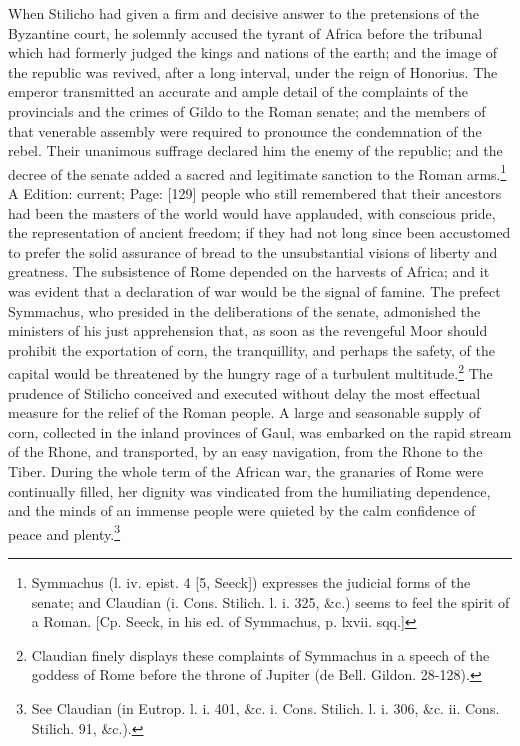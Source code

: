 When Stilicho had given a firm and decisive answer to the pretensions of the Byzantine court, he solemnly accused the tyrant of Africa before the tribunal which had formerly judged the kings and nations of the earth; and the image of the republic was revived, after a long interval, under the reign of Honorius. The emperor transmitted an accurate and ample detail of the complaints of the provincials and the crimes of Gildo to the Roman senate; and the members of that venerable assembly were required to pronounce the condemnation of the rebel. Their unanimous suffrage declared him the enemy of the republic; and the decree of the senate added a sacred and legitimate sanction to the Roman arms.\footnote{Symmachus (l. iv. epist. 4 [5, Seeck]) expresses the judicial forms of the senate; and Claudian (i. Cons. Stilich. l. i. 325, \&c.) seems to feel the spirit of a Roman. [Cp. Seeck, in his ed. of Symmachus, p. lxvii. sqq.]} A Edition: current; Page: [129] people who still remembered that their ancestors had been the masters of the world would have applauded, with conscious pride, the representation of ancient freedom; if they had not long since been accustomed to prefer the solid assurance of bread to the unsubstantial visions of liberty and greatness. The subsistence of Rome depended on the harvests of Africa; and it was evident that a declaration of war would be the signal of famine. The prefect Symmachus, who presided in the deliberations of the senate, admonished the ministers of his just apprehension that, as soon as the revengeful Moor should prohibit the exportation of corn, the tranquillity, and perhaps the safety, of the capital would be threatened by the hungry rage of a turbulent multitude.\footnote{Claudian finely displays these complaints of Symmachus in a speech of the goddess of Rome before the throne of Jupiter (de Bell. Gildon. 28-128).} The prudence of Stilicho conceived and executed without delay the most effectual measure for the relief of the Roman people. A large and seasonable supply of corn, collected in the inland provinces of Gaul, was embarked on the rapid stream of the Rhone, and transported, by an easy navigation, from the Rhone to the Tiber. During the whole term of the African war, the granaries of Rome were continually filled, her dignity was vindicated from the humiliating dependence, and the minds of an immense people were quieted by the calm confidence of peace and plenty.\footnote{See Claudian (in Eutrop. l. i. 401, \&c. i. Cons. Stilich. l. i. 306, \&c. ii. Cons. Stilich. 91, \&c.).}

